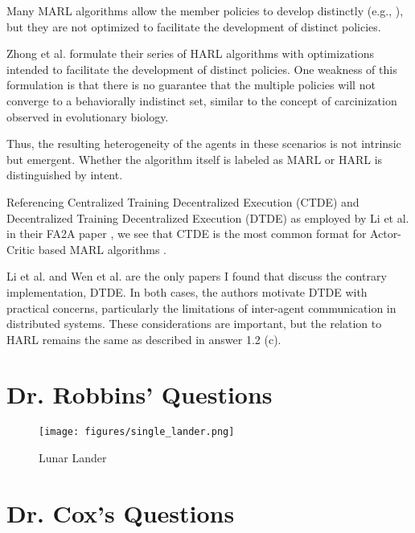 \documentclass[12pt,letterpaper]{exam}
\begin{document}
\begin{questions}
\begin{parts}
		Many MARL algorithms allow the member policies to develop distinctly 
		(e.g., \cite{foerster2017, rashid2018, lowe2020}), but they are 
		not optimized to facilitate the development of distinct policies.

		Zhong et al. \cite{zhong2024} formulate their series of HARL 
		algorithms with optimizations intended to facilitate the development 
		of distinct policies. One weakness of this formulation is that there 
		is no guarantee that the multiple policies will not converge to a 
		behaviorally indistinct set, similar to the concept of 
		carcinization observed in evolutionary biology.

		Thus, the resulting heterogeneity of the agents in these scenarios 
		is not intrinsic but emergent. Whether the algorithm itself is 
		labeled as MARL or HARL is distinguished by intent.
	\end{parts}

	\question
	Referencing Centralized Training Decentralized Execution (CTDE) 
	and Decentralized Training Decentralized Execution (DTDE) as employed 
	by Li et al. in their FA2A paper \cite{li2023d}, we see that CTDE is 
	the most common format for Actor-Critic based MARL algorithms 
	\cite{foerster2017, rashid2018, lowe2020, li2023d, zhou2023}.

	Li et al. \cite{li2023d} and Wen et al. \cite{wen2021} are the only 
	papers I found that discuss the contrary implementation, DTDE. 
	In both cases, the authors motivate DTDE with practical concerns, 
	particularly the limitations of inter-agent communication in 
	distributed systems. These considerations are important, but the 
	relation to HARL remains the same as described in answer 1.2 (c).
\end{questions}







\section{Dr. Robbins' Questions}



\begin{figure}[h]
	\centering
	\texttt{[image: figures/single\_lander.png]}
	\caption{Lunar Lander}
\end{figure}



\section{Dr. Cox's Questions}
\end{document}
